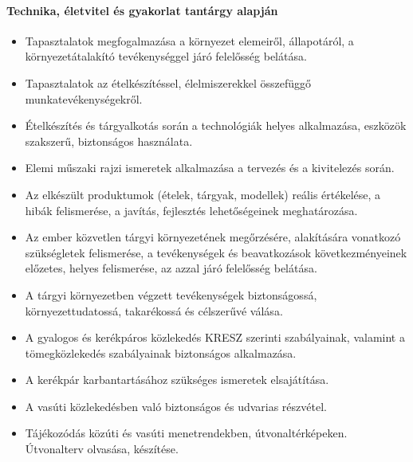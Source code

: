 \paragraph{Technika, életvitel és gyakorlat tantárgy alapján}
\begin{itemize}
\item Tapasztalatok megfogalmazása a környezet elemeiről, állapotáról, a környezetátalakító tevékenységgel járó felelősség belátása.
\item Tapasztalatok az ételkészítéssel, élelmiszerekkel összefüggő munkatevékenységekről.
\item Ételkészítés és tárgyalkotás során a technológiák helyes alkalmazása, eszközök szakszerű, biztonságos használata.
\item Elemi műszaki rajzi ismeretek alkalmazása a tervezés és a kivitelezés során.
\item Az elkészült produktumok (ételek, tárgyak, modellek) reális értékelése, a hibák felismerése, a javítás, fejlesztés lehetőségeinek meghatározása.
\item Az ember közvetlen tárgyi környezetének megőrzésére, alakítására vonatkozó szükségletek felismerése, a tevékenységek és beavatkozások következményeinek előzetes, helyes felismerése, az azzal járó felelősség belátása.
\item A tárgyi környezetben végzett tevékenységek biztonságossá, környezettudatossá, takarékossá és célszerűvé válása.
\item A gyalogos és kerékpáros közlekedés KRESZ szerinti szabályainak, valamint a tömegközlekedés szabályainak biztonságos alkalmazása.
\item A kerékpár karbantartásához szükséges ismeretek elsajátítása.
\item A vasúti közlekedésben való biztonságos és udvarias részvétel.
\item Tájékozódás közúti és vasúti menetrendekben, útvonaltérképeken. Útvonalterv olvasása, készítése.
\end{itemize}
